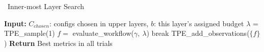 
\begin{algorithm}[h]
\caption{\sysname\ Inner-most Layer Search}
\label{alg:inner}
  \small
\begin{algorithmic}[1]
\STATE \textbf{Input:} $C_{chosen}$: configs chosen in upper layers, $b$: this layer's assigned budget
\STATE
{}
        \STATE $\lambda$ = TPE\_sample(1) 
        \STATE $f = $ evaluate\_workflow($\gamma,\ \lambda$)
        \STATE break
        \ENDIF
        \STATE TPE\_add\_observations($\{f\}$)
    \ENDFOR
\STATE \textbf{Return} Best metrics in all trials
\ENDFUNCTION

\end{algorithmic}
\end{algorithm}